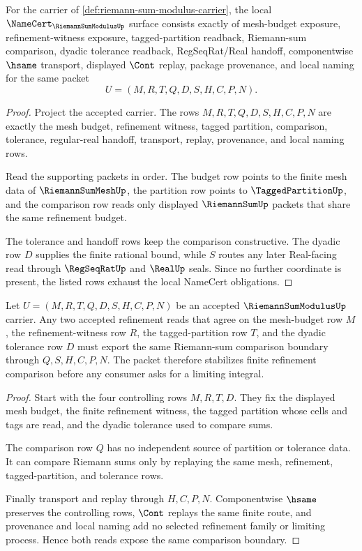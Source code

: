 \begin{theorem}
\label{thm:riemann-sum-modulus-namecert-obligations}
For the carrier of \autoref{def:riemann-sum-modulus-carrier}, the local $\NameCert_{\RiemannSumModulusUp}$ surface consists exactly of mesh-budget exposure, refinement-witness exposure, tagged-partition readback, Riemann-sum comparison, dyadic tolerance readback, RegSeqRat/Real handoff, componentwise $\hsame$ transport, displayed $\Cont$ replay, package provenance, and local naming for the same packet
$$
U=(M,R,T,Q,D,S,H,C,P,N).
$$
\end{theorem}
\begin{proof}
Project the accepted carrier. The rows $M,R,T,Q,D,S,H,C,P,N$ are exactly the mesh budget, refinement witness, tagged partition, comparison, tolerance, regular-real handoff, transport, replay, provenance, and local naming rows.

Read the supporting packets in order. The budget row points to the finite mesh data of $\RiemannSumMeshUp$, the partition row points to $\TaggedPartitionUp$, and the comparison row reads only displayed $\RiemannSumUp$ packets that share the same refinement budget.

The tolerance and handoff rows keep the comparison constructive. The dyadic row $D$ supplies the finite rational bound, while $S$ routes any later Real-facing read through $\RegSeqRatUp$ and $\RealUp$ seals. Since no further coordinate is present, the listed rows exhaust the local NameCert obligations.
\end{proof}

\begin{theorem}
\label{thm:riemann-sum-modulus-refinement-stability}
Let $U=(M,R,T,Q,D,S,H,C,P,N)$ be an accepted $\RiemannSumModulusUp$ carrier. Any two accepted refinement reads that agree on the mesh-budget row $M$, the refinement-witness row $R$, the tagged-partition row $T$, and the dyadic tolerance row $D$ must export the same Riemann-sum comparison boundary through $Q,S,H,C,P,N$. The packet therefore stabilizes finite refinement comparison before any consumer asks for a limiting integral.
\end{theorem}
\begin{proof}
Start with the four controlling rows $M,R,T,D$. They fix the displayed mesh budget, the finite refinement witness, the tagged partition whose cells and tags are read, and the dyadic tolerance used to compare sums.

The comparison row $Q$ has no independent source of partition or tolerance data. It can compare Riemann sums only by replaying the same mesh, refinement, tagged-partition, and tolerance rows.

Finally transport and replay through $H,C,P,N$. Componentwise $\hsame$ preserves the controlling rows, $\Cont$ replays the same finite route, and provenance and local naming add no selected refinement family or limiting process. Hence both reads expose the same comparison boundary.
\end{proof}

